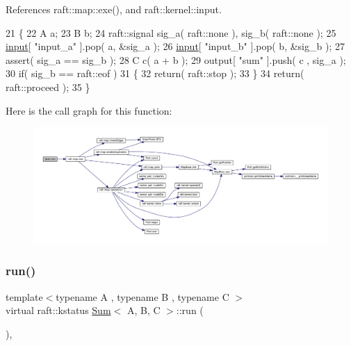 References raft\+::map\+::exe(), and raft\+::kernel\+::input.


\begin{DoxyCode}
21    \{
22       A a;
23       B b;
24       raft::signal  sig\_a( raft::none  ), sig\_b( raft::none );
25       \hyperlink{classraft_1_1kernel_a6edbe35a56409d402e719b3ac36d6554}{input}[ \textcolor{stringliteral}{"input\_a"} ].pop( a, &sig\_a );
26       \hyperlink{classraft_1_1kernel_a6edbe35a56409d402e719b3ac36d6554}{input}[ \textcolor{stringliteral}{"input\_b"} ].pop( b, &sig\_b );
27       assert( sig\_a == sig\_b );
28       C c( a + b );
29       output[ \textcolor{stringliteral}{"sum"} ].push( c , sig\_a );
30       \textcolor{keywordflow}{if}( sig\_b == raft::eof )
31       \{
32          \textcolor{keywordflow}{return}( raft::stop );
33       \}
34       \textcolor{keywordflow}{return}( raft::proceed );
35    \}
\end{DoxyCode}
Here is the call graph for this function\+:
\nopagebreak
\begin{figure}[H]
\begin{center}
\leavevmode
\includegraphics[width=350pt]{class_sum_ab915892675d11a8f3f0de2e7f96b0d28_cgraph}
\end{center}
\end{figure}
\hypertarget{class_sum_ab915892675d11a8f3f0de2e7f96b0d28}{}\label{class_sum_ab915892675d11a8f3f0de2e7f96b0d28} 
\subsubsection{\texorpdfstring{run()}{run()}\hspace{0.1cm}{\footnotesize\ttfamily [2/3]}}
{\footnotesize\ttfamily template$<$typename A , typename B , typename C $>$ \\
virtual raft\+::kstatus \hyperlink{class_sum}{Sum}$<$ A, B, C $>$\+::run (\begin{DoxyParamCaption}{ }\end{DoxyParamCaption})\hspace{0.3cm}{\ttfamily [inline]}, {\ttfamily [virtual]}}

